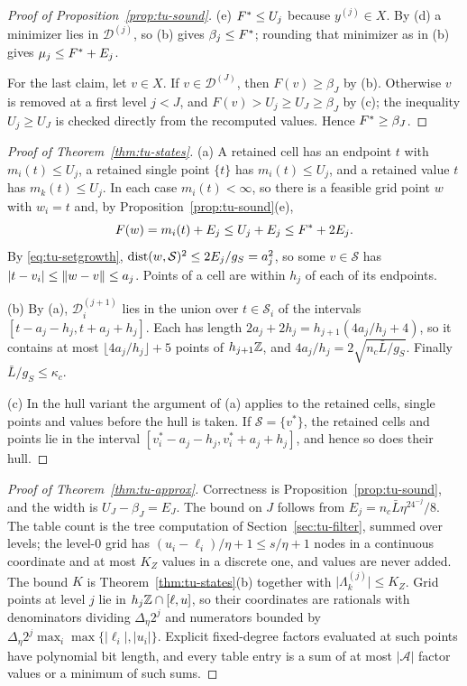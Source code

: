 \begin{proof}[Proof of Proposition~\ref{prop:tu-sound}]
(e) $F^{*}\le U_j$ because $y^{(j)}\in X$. By (d) a minimizer lies in
$\mathcal D^{(j)}$, so (b) gives $\beta_j\le F^{*}$; rounding that minimizer as
in (b) gives $\mu_j\le F^{*}+E_j$.

For the last claim, let $v\in X$. If $v\in\mathcal D^{(J)}$, then
$F(v)\ge\beta_J$ by (b). Otherwise $v$ is removed at a first level $j<J$, and
$F(v)>U_j\ge U_J\ge\beta_J$ by (c); the inequality $U_j\ge U_J$ is checked
directly from the recomputed values. Hence $F^{*}\ge\beta_J$.
\end{proof}

\begin{proof}[Proof of Theorem~\ref{thm:tu-states}]
(a) A retained cell has an endpoint $t$ with $m_i(t)\le U_j$, a retained
single point $\{t\}$ has $m_i(t)\le U_j$, and a retained value $t$ has
$m_k(t)\le U_j$. In each case $m_i(t)<\infty$, so there is a feasible grid
point $w$ with $w_i=t$ and, by Proposition~\ref{prop:tu-sound}(e),
\[
F(w)=m_i(t)+E_j\le U_j+E_j\le F^{*}+2E_j .
\]
By \eqref{eq:tu-setgrowth}, $\operatorname{dist}(w,\mathcal S)^2\le2E_j/g_S=a_j^2$, so some
$v\in\mathcal S$ has $\lvert t-v_i\rvert\le\lVert w-v\rVert\le a_j$. Points of a cell
are within $h_j$ of each of its endpoints.

(b) By (a), $\mathcal D^{(j+1)}_i$ lies in the union over $t\in\mathcal S_i$
of the intervals $[t-a_j-h_j,t+a_j+h_j]$. Each has length
$2a_j+2h_j=h_{j+1}(4a_j/h_j+4)$, so it contains at most
$\lfloor4a_j/h_j\rfloor+5$ points of $h_{j+1}\mathbb Z$, and
$4a_j/h_j=2\sqrt{n_c\bar L/g_S}$. Finally $\bar L/g_S\le\kappa_c$.

(c) In the hull variant the argument of (a) applies to the retained cells,
single points and values before the hull is taken. If $\mathcal S=\{v^*\}$,
the retained cells and points lie in the interval
$[v^*_i-a_j-h_j,v^*_i+a_j+h_j]$, and hence so does their hull.
\end{proof}

\begin{proof}[Proof of Theorem~\ref{thm:tu-approx}]
Correctness is Proposition~\ref{prop:tu-sound}, and the width is
$U_J-\beta_J=E_J$. The bound on $J$ follows from $E_j=n_c\bar L\eta^24^{-j}/8$.
The table count is the tree computation of Section~\ref{sec:tu-filter},
summed over levels; the level-$0$ grid has
$(u_i-\ell_i)/\eta+1\le s/\eta+1$ nodes in a continuous
coordinate and at most $K_Z$ values in a discrete one, and values are never
added. The bound $K$ is Theorem~\ref{thm:tu-states}(b) together with
$\lvert\Lambda^{(j)}_k\rvert\le K_Z$. Grid points at level $j$ lie in
$h_j\mathbb Z\cap[\ell,u]$, so their coordinates are rationals with denominators
dividing $\Delta_\eta2^j$ and numerators bounded by
$\Delta_\eta2^j\max_i\max\{\lvert\ell_i\rvert,\lvert u_i\rvert\}$. Explicit
fixed-degree factors evaluated at such points have polynomial bit length,
and every table entry is a sum of at most $\lvert\mathcal A\rvert$ factor
values or a minimum of such sums.
\end{proof}

